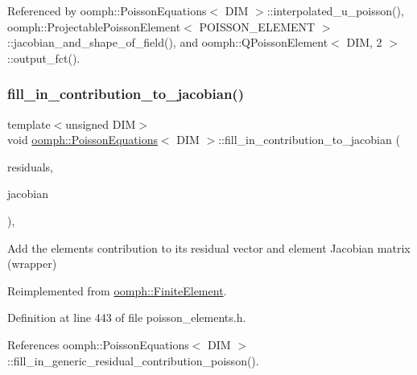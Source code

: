 Referenced by oomph\+::\+Poisson\+Equations$<$ D\+I\+M $>$\+::interpolated\+\_\+u\+\_\+poisson(), oomph\+::\+Projectable\+Poisson\+Element$<$ P\+O\+I\+S\+S\+O\+N\+\_\+\+E\+L\+E\+M\+E\+N\+T $>$\+::jacobian\+\_\+and\+\_\+shape\+\_\+of\+\_\+field(), and oomph\+::\+Q\+Poisson\+Element$<$ D\+I\+M, 2 $>$\+::output\+\_\+fct().

\mbox{\label{classoomph_1_1PoissonEquations_ad5e268cfc535826603e868612f892c49}} 
\subsubsection{\texorpdfstring{fill\+\_\+in\+\_\+contribution\+\_\+to\+\_\+jacobian()}{fill\_in\_contribution\_to\_jacobian()}}
{\footnotesize\ttfamily template$<$unsigned D\+IM$>$ \\
void \hyperlink{classoomph_1_1PoissonEquations}{oomph\+::\+Poisson\+Equations}$<$ D\+IM $>$\+::fill\+\_\+in\+\_\+contribution\+\_\+to\+\_\+jacobian (\begin{DoxyParamCaption}\item[{\hyperlink{classoomph_1_1Vector}{Vector}$<$ double $>$ \&}]{residuals,  }\item[{\hyperlink{classoomph_1_1DenseMatrix}{Dense\+Matrix}$<$ double $>$ \&}]{jacobian }\end{DoxyParamCaption})\hspace{0.3cm}{\ttfamily [inline]}, {\ttfamily [virtual]}}

Add the element\textquotesingle{}s contribution to its residual vector and element Jacobian matrix (wrapper) 

Reimplemented from \hyperlink{classoomph_1_1FiniteElement_a0ae7af222af38a0d53bf283dc85bdfea}{oomph\+::\+Finite\+Element}.



Definition at line 443 of file poisson\+\_\+elements.\+h.



References oomph\+::\+Poisson\+Equations$<$ D\+I\+M $>$\+::fill\+\_\+in\+\_\+generic\+\_\+residual\+\_\+contribution\+\_\+poisson().

\mbox{\label{classoomph_1_1PoissonEquations_a2b6578ce3ddd81293242becba40aaf3f}} 
